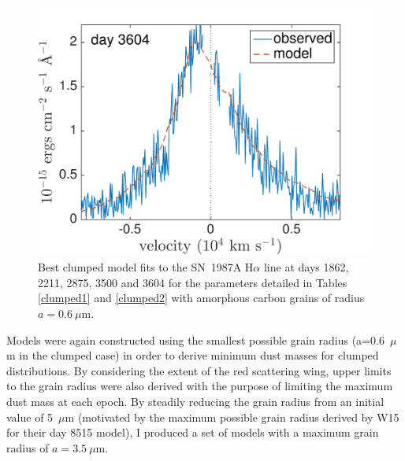 \begin{figure}
\includegraphics[trim =30 0 0 0,clip=true,scale=0.39]{chapters/chapter5/images/clump_1/maximum/d3604Ha.pdf}
\vspace{8mm}
\caption{Best clumped model fits to the SN~1987A H$\alpha$ line at days 1862, 2211, 2875, 3500 and 3604 for the parameters detailed in Tables \ref{clumped1} and \ref{clumped2} with amorphous carbon grains of radius $a=0.6~\mu$m.}
\label{d1862_3604}
\end{figure}

Models were again constructed using the smallest possible grain radius (a=0.6~$\mu$m in the clumped case) in order to derive minimum dust masses 
for clumped distributions.  By considering the extent of the red 
scattering wing, upper limits to the grain radius were also derived with the 
purpose of limiting the maximum dust mass at each epoch.  By steadily 
reducing the grain radius from an initial value of 5~$\mu$m (motivated by 
the maximum possible grain radius derived by W15 for their day 8515 model), 
I produced a set of models with a maximum grain radius of $a=3.5~\mu$m.  

